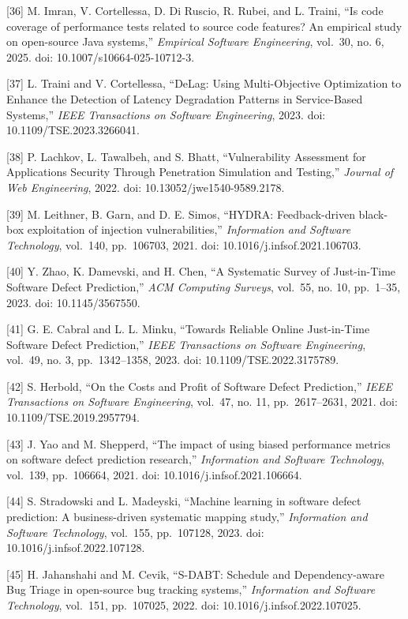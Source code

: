 \documentclass[
  12pt,
]{report}
\begin{document}
{[}36{]} M. Imran, V. Cortellessa, D. Di Ruscio, R. Rubei, and L.
Traini, ``Is code coverage of performance tests related to source code
features? An empirical study on open-source Java systems,''
\emph{Empirical Software Engineering}, vol.~30, no. 6, 2025. doi:
10.1007/s10664-025-10712-3.

{[}37{]} L. Traini and V. Cortellessa, ``DeLag: Using Multi-Objective
Optimization to Enhance the Detection of Latency Degradation Patterns in
Service-Based Systems,'' \emph{IEEE Transactions on Software
Engineering}, 2023. doi: 10.1109/TSE.2023.3266041.

{[}38{]} P. Lachkov, L. Tawalbeh, and S. Bhatt, ``Vulnerability
Assessment for Applications Security Through Penetration Simulation and
Testing,'' \emph{Journal of Web Engineering}, 2022. doi:
10.13052/jwe1540-9589.2178.

{[}39{]} M. Leithner, B. Garn, and D. E. Simos, ``HYDRA: Feedback-driven
black-box exploitation of injection vulnerabilities,'' \emph{Information
and Software Technology}, vol.~140, pp.~106703, 2021. doi:
10.1016/j.infsof.2021.106703.

{[}40{]} Y. Zhao, K. Damevski, and H. Chen, ``A Systematic Survey of
Just-in-Time Software Defect Prediction,'' \emph{ACM Computing Surveys},
vol.~55, no. 10, pp.~1--35, 2023. doi: 10.1145/3567550.

{[}41{]} G. E. Cabral and L. L. Minku, ``Towards Reliable Online
Just-in-Time Software Defect Prediction,'' \emph{IEEE Transactions on
Software Engineering}, vol.~49, no. 3, pp.~1342--1358, 2023. doi:
10.1109/TSE.2022.3175789.

{[}42{]} S. Herbold, ``On the Costs and Profit of Software Defect
Prediction,'' \emph{IEEE Transactions on Software Engineering}, vol.~47,
no. 11, pp.~2617--2631, 2021. doi: 10.1109/TSE.2019.2957794.

{[}43{]} J. Yao and M. Shepperd, ``The impact of using biased
performance metrics on software defect prediction research,''
\emph{Information and Software Technology}, vol.~139, pp.~106664, 2021.
doi: 10.1016/j.infsof.2021.106664.

{[}44{]} S. Stradowski and L. Madeyski, ``Machine learning in software
defect prediction: A business-driven systematic mapping study,''
\emph{Information and Software Technology}, vol.~155, pp.~107128, 2023.
doi: 10.1016/j.infsof.2022.107128.

{[}45{]} H. Jahanshahi and M. Cevik, ``S-DABT: Schedule and
Dependency-aware Bug Triage in open-source bug tracking systems,''
\emph{Information and Software Technology}, vol.~151, pp.~107025, 2022.
doi: 10.1016/j.infsof.2022.107025.
\end{document}
